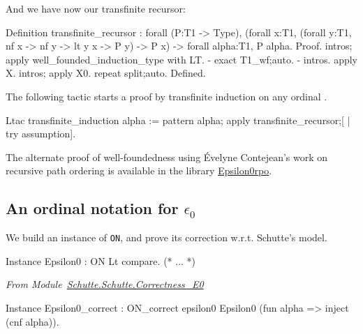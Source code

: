 \documentclass[a4paper]{book}
\begin{document}
And we have now our transfinite recursor:

\begin{Coqsrc}

Definition transfinite_recursor :
 forall (P:T1 -> Type),
   (forall x:T1, 
     (forall y:T1, nf x -> nf y ->  lt y  x -> P y) -> P x) ->
    forall alpha:T1, P alpha.
Proof.
 intros; apply well_founded_induction_type with LT.
 -  exact T1_wf;auto.
 - intros. apply X. intros; apply X0. repeat split;auto. 
Defined.
\end{Coqsrc}

The following tactic starts a proof by  transfinite induction on any ordinal .

\begin{Coqsrc}
Ltac transfinite_induction alpha :=
  pattern alpha; apply transfinite_recursor;[ | try assumption].
\end{Coqsrc}


\begin{remark}
The alternate proof of well-foundedness using \'Evelyne Contejean's work on recursive path ordering is available in the library \href{../src/html/hydras.Epsilon0.Epsilon0rpo.html}{Epsilon0rpo}.
 \end{remark}


\subsection{An ordinal notation for  \texorpdfstring{$\epsilon_0$}{epsilon0}}

We build an instance of \texttt{ON}, and prove its correction w.r.t. Schutte's model.

\begin{Coqsrc}
Instance Epsilon0 : ON Lt compare.  
(* ... *)
\end{Coqsrc}


\emph{From Module~\href{../src/html/hydras.Schutte.Schutte.Correctness_E0.html}{Schutte.Schutte.Correctness\_E0}}

\begin{Coqsrc}
Instance Epsilon0_correct :
  ON_correct epsilon0 Epsilon0 (fun alpha => inject (cnf alpha)).
\end{Coqsrc}
\end{document}
